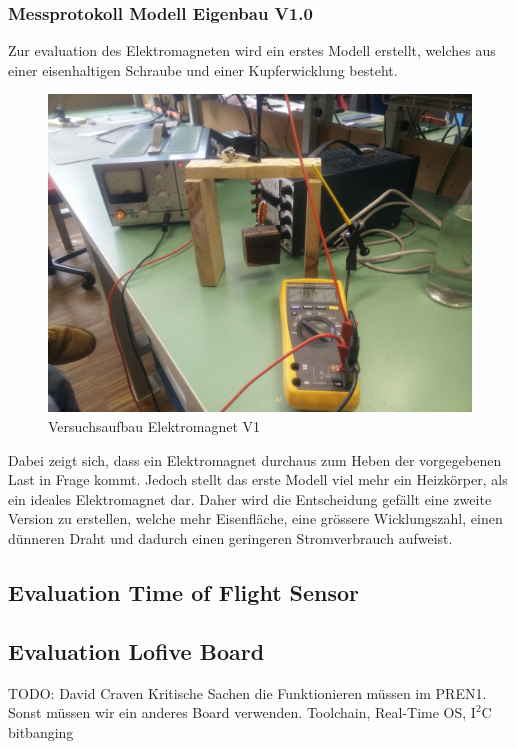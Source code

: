 \documentclass[a4paper]{report}
\begin{document}
\subsubsection{Messprotokoll Modell Eigenbau V1.0}
Zur evaluation des Elektromagneten wird ein erstes Modell erstellt, welches aus einer eisenhaltigen Schraube und einer Kupferwicklung besteht.
\begin{figure}[h!]
	\includegraphics[keepaspectratio,width=\textwidth]{Versuchsaufbau_Elektromagnet_v1}
	\caption{Versuchsaufbau Elektromagnet V1}
	\label{fig:VersuchsaufbauElektromagnet}
\end{figure}

Dabei zeigt sich, dass ein Elektromagnet durchaus zum Heben der vorgegebenen Last in Frage kommt. Jedoch stellt das erste Modell viel mehr ein Heizkörper, als ein ideales Elektromagnet dar.
Daher wird die Entscheidung gefällt eine zweite Version zu erstellen, welche mehr Eisenfläche, eine grössere Wicklungszahl, einen dünneren Draht und dadurch einen geringeren Stromverbrauch aufweist.

\subsection{Evaluation Time of Flight Sensor}

\subsection{Evaluation Lofive Board}
TODO: David Craven
Kritische Sachen die Funktionieren müssen im PREN1. Sonst müssen wir ein anderes
Board verwenden.
Toolchain, Real-Time OS, $\text{I}^2\text{C}$ bitbanging
\end{document}
